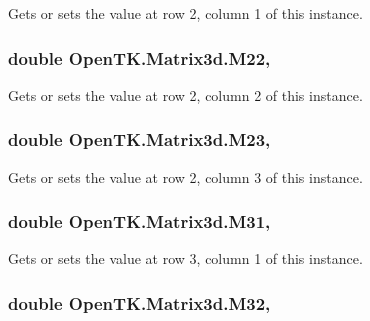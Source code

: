 Gets or sets the value at row 2, column 1 of this instance. 

\hypertarget{struct_open_t_k_1_1_matrix3d_ae481cd26be905ba8f9813e9019a12e7f}{
\subsubsection[{M22}]{\setlength{\rightskip}{0pt plus 5cm}double Open\-T\-K.\-Matrix3d.\-M22\hspace{0.3cm}{\ttfamily [get]}, {\ttfamily [set]}}}\label{struct_open_t_k_1_1_matrix3d_ae481cd26be905ba8f9813e9019a12e7f}


Gets or sets the value at row 2, column 2 of this instance. 

\hypertarget{struct_open_t_k_1_1_matrix3d_a30ac310ded09509b0906cb45c4652ae8}{
\subsubsection[{M23}]{\setlength{\rightskip}{0pt plus 5cm}double Open\-T\-K.\-Matrix3d.\-M23\hspace{0.3cm}{\ttfamily [get]}, {\ttfamily [set]}}}\label{struct_open_t_k_1_1_matrix3d_a30ac310ded09509b0906cb45c4652ae8}


Gets or sets the value at row 2, column 3 of this instance. 

\hypertarget{struct_open_t_k_1_1_matrix3d_ae18e54b15e57575566986a81984233b3}{
\subsubsection[{M31}]{\setlength{\rightskip}{0pt plus 5cm}double Open\-T\-K.\-Matrix3d.\-M31\hspace{0.3cm}{\ttfamily [get]}, {\ttfamily [set]}}}\label{struct_open_t_k_1_1_matrix3d_ae18e54b15e57575566986a81984233b3}


Gets or sets the value at row 3, column 1 of this instance. 

\hypertarget{struct_open_t_k_1_1_matrix3d_abfd29a3e41fcf8decb6c1a4d94e8770b}{
\subsubsection[{M32}]{\setlength{\rightskip}{0pt plus 5cm}double Open\-T\-K.\-Matrix3d.\-M32\hspace{0.3cm}{\ttfamily [get]}, {\ttfamily [set]}}}\label{struct_open_t_k_1_1_matrix3d_abfd29a3e41fcf8decb6c1a4d94e8770b}


